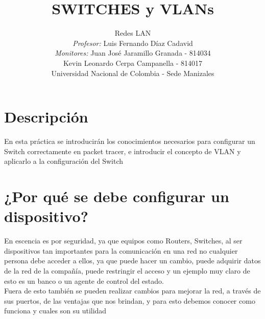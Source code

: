 \documentclass[journal]{IEEEtran}
\title{\textbf{SWITCHES y VLANs}}
\author{Redes LAN \\
	\textit{Profesor:} Luis Fernando Díaz Cadavid\\ 
	\textit{Monitores:} Juan José Jaramillo Granada - 814034 \\
	Kevin Leonardo Cerpa Campanella - 814017 \\
	Universidad Nacional de Colombia - Sede Manizales}
\date{}
\begin{document}
\maketitle

\section{\textbf{Descripción}}
En esta práctica se introducirán los conocimientos necesarios para configurar un Switch correctamente en packet tracer, e introducir el concepto de VLAN y aplicarlo a la configuración del Switch


\section{\textbf{¿Por qué se debe configurar un dispositivo?}}
En escencia es por seguridad, ya que equipos como Routers, Switches, al ser dispositivos tan importantes para la comunicación en una red no cualquier persona debe acceder a ellos, ya que puede hacer un cambio, puede adquirir datos de la red de la compañía, puede restringir el acceso y un ejemplo muy claro de esto es un banco o un agente de control del estado. \\
Fuera de esto también se pueden realizar cambios para mejorar la red, a través de sus puertos, de las ventajas que nos brindan, y para esto debemos conocer como funciona y cuales son su utilidad
\end{document}
